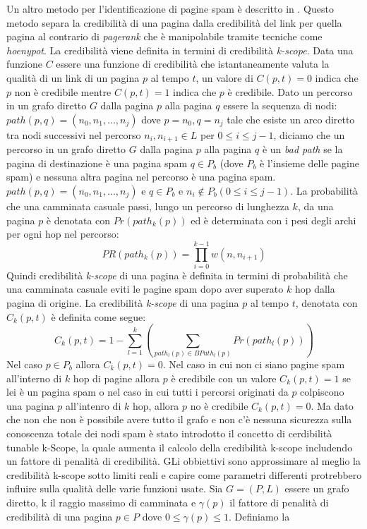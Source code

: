Un altro metodo per l'identificazione di pagine spam è descritto in \cite{Caverlee:2007:CWS:1281100.1281124}. Questo metodo separa la credibilità di una pagina dalla credibilità del link per quella pagina al contrario di \textit{pagerank} che è manipolabile tramite tecniche come \textit{hoenypot}. La credibilità viene definita in termini di credibilità \textit{k-scope}. Data una funzione \(C\) essere una funzione di credibilità che istantaneamente valuta la qualità di un link di un pagina \(p\) al tempo \(t\), un valore di \(C(p,t)=0\) indica che \(p\) non è credibile mentre \(C(p,t)=1\) indica che \(p\) è credibile. Dato  un percorso in un grafo diretto \(G\) dalla pagina \(p\) alla pagina \(q\) essere la sequenza di nodi: \(path(p,q)=(n_0,n_1,...,n_j)\) dove \(p=n_0, q=n_j\) tale che esiste un arco diretto tra nodi successivi nel percorso \(n_i,n_{i+1}\in L\) per \(0\leq i \leq j-1\), diciamo che un percorso  in un grafo diretto \(G\) dalla pagina \(p\) alla pagina \(q\) è un \textit{bad path} se la pagina 
di destinazione è una pagina spam \(q\in P_b\) (dove \(P_b\) è l'insieme delle pagine spam) e nessuna altra pagina nel percorso è una pagina spam. \(path(p,q)=(n_0,n_1,...,n_j)\) e \(q\in P_b\) e \(n_i\not\in P_b (0\leq i\leq j-1)\). La probabilità che una camminata casuale passi, lungo un percorso di lunghezza \(k\), da una pagina \(p\) è denotata con \(Pr(path_k(p))\) ed è determinata con i pesi degli archi per ogni hop nel percorso:
\begin{equation}
 PR(path_k(p))=\prod_{i=0}^{k-1}w(n,n_{i+1})
\end{equation}
Quindi credibilità \textit{k-scope} di una pagina  è definita in termini di probabilità che una camminata casuale eviti le pagine spam dopo aver superato \(k\) hop dalla pagina di origine. La credibilità \textit{k-scope} di una pagina \(p\) al tempo \(t\), denotata con \(C_k(p,t)\) è definita come segue:
\begin{equation}
 C_k(p,t)=1-\sum_{l=1}^k\left (\sum_{path_l(p)\in BPath_l(p)}Pr(path_l(p))\right )
\end{equation}
Nel caso \(p\in P_b\) allora \(C_k(p,t)=0\). Nel caso in cui non ci siano pagine spam all'interno di \(k\) hop di pagine allora \(p\) è credibile con un valore \(C_k(p,t)=1\) se lei è un pagina spam o nel caso in cui tutti i percorsi originati da \(p\) colpiscono una pagina \(p\) all'intenro di \(k\) hop, allora \(p\) no è credibile \(C_k(p,t)=0\). Ma dato che non che non è possibile avere tutto il grafo e non c'è nessuna sicurezza sulla conoscenza totale dei nodi spam è stato introdotto il concetto di cerdibilità tunable k-Scope, la quale aumenta il calcolo della credibilità k-scope includendo un fattore di penalità di credibilità. GLi obbiettivi sono approssimare al meglio la credibilità k-scope sotto limiti reali e capire come parametri differenti protrebbero influire sulla qualità delle varie funzioni usate. Sia \(G=(P,L)\) essere un grafo diretto, k il raggio massimo di camminata e \(\gamma(p)\) il fattore di penalità di credibilità di una pagina \(p\in P\) dove \(0\leq \gamma(p)\leq 1\). Definiamo la 
